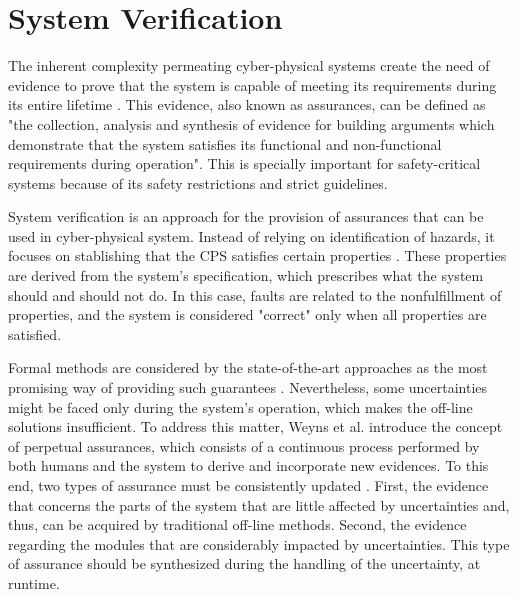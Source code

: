 	
	
	
    

\section{System Verification}

The inherent complexity permeating cyber-physical systems create the need of evidence to prove that the system is capable of meeting its requirements during its entire lifetime \cite{assurances2017}. This evidence, also known as assurances, can be defined as "the collection, analysis and synthesis of evidence for building arguments which demonstrate that the system satisfies its functional and non-functional requirements during operation". This is specially important for safety-critical systems because of its safety restrictions and strict guidelines.

System verification is an approach for the provision of assurances that can be used in cyber-physical system. Instead of relying on identification of hazards, it focuses on stablishing that the CPS satisfies certain properties \cite{2008PrinciplesModelChecking}. These properties are derived from the system's specification, which prescribes what the system should and should not do. In this case, faults are related to the nonfulfillment of properties, and the system is considered "correct" only when all properties are satisfied. 

Formal methods are considered by the state-of-the-art approaches as the most promising way of providing such guarantees  \cite{assurances2017}. Nevertheless, some uncertainties might be faced only during the system's operation, which makes the off-line solutions insufficient. To address this matter, Weyns et al. \cite{2019PerpetualAssurancesWeyns} introduce the concept of perpetual assurances, which consists of a continuous process performed by both humans and the system to derive and incorporate new evidences. To this end, two types of assurance must be consistently updated  \cite{assurances2017}. First, the evidence that concerns the parts of the system that are little affected by uncertainties and, thus, can be acquired by traditional off-line methods. Second, the evidence regarding the modules that are considerably impacted by uncertainties. This type of assurance should be synthesized during the handling of the uncertainty, at runtime.

